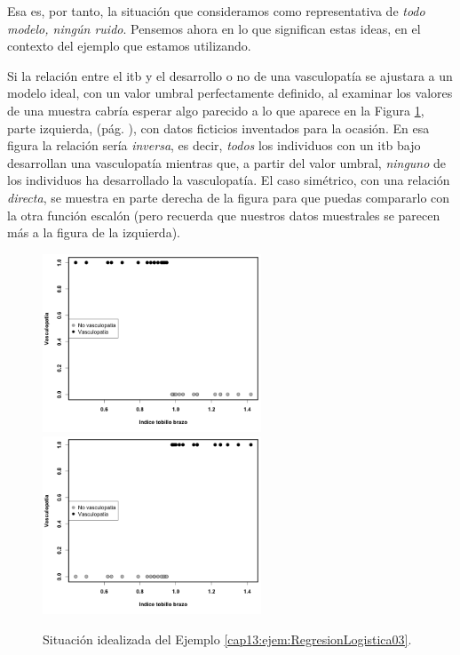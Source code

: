 Esa es, por tanto, la situación que consideramos como representativa de {\em todo modelo, ningún ruido}. Pensemos ahora en lo que significan estas ideas, en el contexto del ejemplo que estamos utilizando.
\begin{ejemplo}
\label{cap13:ejem:RegresionLogistica03}
Si la relación entre el itb y el desarrollo o no de una vasculopatía se ajustara a un modelo ideal, con un valor umbral perfectamente definido, al examinar los valores de una muestra cabría esperar algo parecido a lo que aparece en la Figura \ref{cap13:fig:QueEsperarLogistica}, parte izquierda, (pág. \pageref{cap13:fig:QueEsperarLogistica}), con datos ficticios inventados para la ocasi\'on. En esa figura la relación sería {\em inversa}, es decir,
{\em todos} los individuos con un itb bajo desarrollan una vasculopatía mientras que, a partir del valor umbral, {\em ninguno} de los individuos ha desarrollado la vasculopatía. El caso simétrico, con una relación {\em directa}, se muestra en parte derecha de la figura para que puedas compararlo con la otra función escalón (pero recuerda que nuestros datos muestrales se parecen más a la figura de la izquierda).
\begin{figure}[h!]
\begin{center}
    \includegraphics[width=6.5cm]{../fig/Cap13-QueEsperarLogistica2.png}%
    \includegraphics[width=6.5cm]{../fig/Cap13-QueEsperarLogistica1.png}%
     \caption{Situación idealizada del Ejemplo \ref{cap13:ejem:RegresionLogistica03}.
     	}
       \label{cap13:fig:QueEsperarLogistica}
   \end{center}
\end{figure}


\end{ejemplo}
